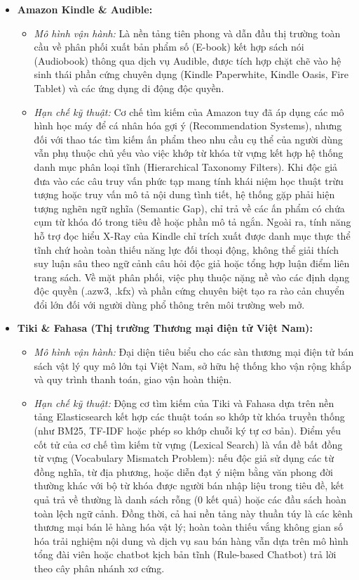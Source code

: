 \documentclass[11pt, a4paper]{report}
\begin{document}
\begin{itemize}
    \item \textbf{Amazon Kindle \& Audible:}
    \begin{itemize}
        \item \textit{Mô hình vận hành:} Là nền tảng tiên phong và dẫn đầu thị trường toàn cầu về phân phối xuất bản phẩm số (E-book) kết hợp sách nói (Audiobook) thông qua dịch vụ Audible, được tích hợp chặt chẽ vào hệ sinh thái phần cứng chuyên dụng (Kindle Paperwhite, Kindle Oasis, Fire Tablet) và các ứng dụng di động độc quyền.
        \item \textit{Hạn chế kỹ thuật:} Cơ chế tìm kiếm của Amazon tuy đã áp dụng các mô hình học máy để cá nhân hóa gợi ý (Recommendation Systems), nhưng đối với thao tác tìm kiếm ấn phẩm theo nhu cầu cụ thể của người dùng vẫn phụ thuộc chủ yếu vào việc khớp từ khóa từ vựng kết hợp hệ thống danh mục phân loại tĩnh (Hierarchical Taxonomy Filters). Khi độc giả đưa vào các câu truy vấn phức tạp mang tính khái niệm học thuật trừu tượng hoặc truy vấn mô tả nội dung tình tiết, hệ thống gặp phải hiện tượng nghẽn ngữ nghĩa (Semantic Gap), chỉ trả về các ấn phẩm có chứa cụm từ khóa đó trong tiêu đề hoặc phần mô tả ngắn. Ngoài ra, tính năng hỗ trợ đọc hiểu X-Ray của Kindle chỉ trích xuất được danh mục thực thể tĩnh chứ hoàn toàn thiếu năng lực đối thoại động, không thể giải thích suy luận sâu theo ngữ cảnh câu hỏi độc giả hoặc tổng hợp luận điểm liên trang sách. Về mặt phân phối, việc phụ thuộc nặng nề vào các định dạng độc quyền (.azw3, .kfx) và phần cứng chuyên biệt tạo ra rào cản chuyển đổi lớn đối với người dùng phổ thông trên môi trường web mở.
    \end{itemize}
    \item \textbf{Tiki \& Fahasa (Thị trường Thương mại điện tử Việt Nam):}
    \begin{itemize}
        \item \textit{Mô hình vận hành:} Đại diện tiêu biểu cho các sàn thương mại điện tử bán sách vật lý quy mô lớn tại Việt Nam, sở hữu hệ thống kho vận rộng khắp và quy trình thanh toán, giao vận hoàn thiện.
        \item \textit{Hạn chế kỹ thuật:} Động cơ tìm kiếm của Tiki và Fahasa dựa trên nền tảng Elasticsearch kết hợp các thuật toán so khớp từ khóa truyền thống (như BM25, TF-IDF hoặc phép so khớp chuỗi ký tự cơ bản). Điểm yếu cốt tử của cơ chế tìm kiếm từ vựng (Lexical Search) là vấn đề bất đồng từ vựng (Vocabulary Mismatch Problem): nếu độc giả sử dụng các từ đồng nghĩa, từ địa phương, hoặc diễn đạt ý niệm bằng văn phong đời thường khác với bộ từ khóa được người bán nhập liệu trong tiêu đề, kết quả trả về thường là danh sách rỗng ($0$ kết quả) hoặc các đầu sách hoàn toàn lệch ngữ cảnh. Đồng thời, cả hai nền tảng này thuần túy là các kênh thương mại bán lẻ hàng hóa vật lý; hoàn toàn thiếu vắng không gian số hóa trải nghiệm nội dung và dịch vụ sau bán hàng vẫn dựa trên mô hình tổng đài viên hoặc chatbot kịch bản tĩnh (Rule-based Chatbot) trả lời theo cây phân nhánh xơ cứng.

\end{itemize}
\end{itemize}
\end{document}
